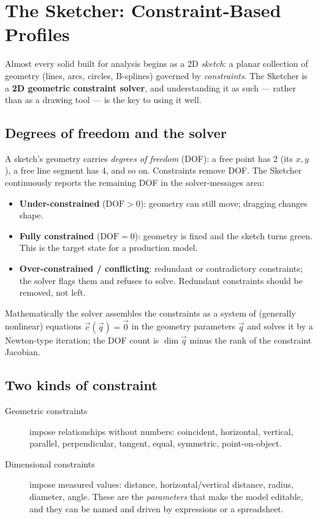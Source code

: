 \chapter{The Sketcher: Constraint-Based Profiles}
\label{ch:sketcher}

Almost every solid built for analysis begins as a 2D \emph{sketch}: a
planar collection of geometry (lines, arcs, circles, B-splines)
governed by \emph{constraints}. The Sketcher is a
\textbf{2D geometric constraint solver}, and understanding it as such ---
rather than as a drawing tool --- is the key to using it well.

\section{Degrees of freedom and the solver}

A sketch's geometry carries \emph{degrees of freedom} (DOF): a free point
has 2 (its $x,y$), a free line segment has 4, and so on. Constraints
remove DOF. The Sketcher continuously reports the remaining DOF in the
solver-messages area:

\begin{itemize}
  \item \textbf{Under-constrained} ($\text{DOF}>0$): geometry can still
        move; dragging changes shape.
  \item \textbf{Fully constrained} ($\text{DOF}=0$): geometry is fixed
        and the sketch turns green. This is the target state for a
        production model.
  \item \textbf{Over-constrained / conflicting}: redundant or
        contradictory constraints; the solver flags them and refuses to
        solve. Redundant constraints should be removed, not left.
\end{itemize}

Mathematically the solver assembles the constraints as a system of
(generally nonlinear) equations $\vec{c}(\vec{q})=\vec 0$ in the geometry
parameters $\vec q$ and solves it by a Newton-type iteration; the DOF
count is $\dim\vec q$ minus the rank of the constraint Jacobian.

\section{Two kinds of constraint}

\begin{description}
  \item[Geometric constraints] impose relationships without numbers:
        coincident, horizontal, vertical, parallel, perpendicular,
        tangent, equal, symmetric, point-on-object.
  \item[Dimensional constraints] impose measured values: distance,
        horizontal/vertical distance, radius, diameter, angle. These are
        the \emph{parameters} that make the model editable, and they can
        be named and driven by expressions or a spreadsheet.
\end{description}

